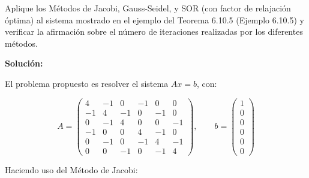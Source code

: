 Aplique los Métodos de Jacobi, Gauss-Seidel, y SOR (con factor de relajación óptima) al sistema mostrado en el ejemplo del Teorema 6.10.5 (Ejemplo 6.10.5) y verificar la afirmación sobre el número de iteraciones realizadas por los diferentes métodos.

\textbf{Solución:}

El problema propuesto es resolver el sistema $Ax=b$, con:

\begin{equation}
    A = 
    \begin{pmatrix}
     4 &	-1 &	 0 &	-1 &	 0 &	 0 \\
    -1 &	 4 &	-1 &	 0 &	-1 &	 0 \\
     0 &	-1 &	 4 &	 0 &	 0 &	-1 \\
    -1 &	 0 &	 0 &	 4 &	-1 &	 0 \\
     0 &	-1 &	 0 &	-1 &	 4 &	-1 \\
     0 &	 0 &	-1 &	 0 &	-1 &	 4
    \end{pmatrix}
    , \quad \quad
    b = 
    \begin{pmatrix}
     1 \\
     0 \\
     0 \\
     0 \\
     0 \\
     0 
    \end{pmatrix}
\end{equation}

Haciendo uso del Método de Jacobi:

